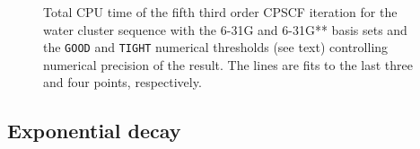 \documentclass[twocolumn,showpacs,preprintnumbers,amsmath,amssymb]{revtex4}
\begin{document}
\begin{figure}[t]
  \caption{\protect
    Total CPU time of the fifth third order CPSCF iteration for
    the water cluster sequence with the 6-31G and 6-31G** 
    basis sets and the {\tt GOOD} and {\tt TIGHT} 
    numerical thresholds (see text) controlling numerical
    precision of the result. The lines are fits to the 
    last three and four points, respectively.
  }\label{Beta_scaling}
\end{figure}



\subsection{Exponential decay}
\end{document}
